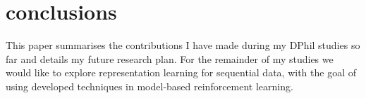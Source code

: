\section{conclusions}
\label{sec:conclusions}

    This paper summarises the contributions I have made during my DPhil studies so far and details my future research plan. For the remainder of my studies we would like to explore representation learning for sequential data, with the goal of using developed techniques in model-based reinforcement learning.